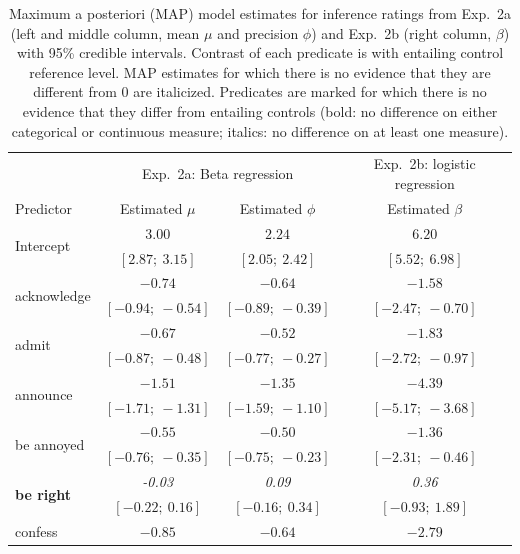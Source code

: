 \documentclass[11pt,fleqn]{article}
\newcommand{\6}{\mbox{$[\hspace*{-.6mm}[$}}
\newcommand{\9}{\mbox{$]\hspace*{-.6mm}]$}}
\begin{document}
\begin{table}
\caption{Maximum a posteriori (MAP) model estimates for inference ratings from Exp.~2a (left and middle column, mean $\mu$ and precision $\phi$) and Exp.~2b (right column, $\beta$)  with 95\% credible intervals. Contrast of each predicate is with entailing control reference level. MAP estimates for which there is no evidence that they are different from 0 are italicized. Predicates are marked for which there is no evidence that they differ from  entailing controls (bold: no difference on either categorical or continuous measure; italics: no difference on at least one measure).}
\small
\begin{center}
\begin{tabular}{l c c c}
\toprule
& \multicolumn{2}{c}{Exp.~2a: Beta regression} & Exp.~2b: logistic regression \\
Predictor & Estimated $\mu$ & Estimated $\phi$ & Estimated $\beta$\\
\midrule
\multirow{2}{*}{Intercept}            & $3.00$        & $2.24$        & $6.20$          \\
                        & $[2.87;\ 3.15]$   & $[2.05;\ 2.42]$   & $[5.52;\ 6.98]$     \\
\multirow{2}{*}{acknowledge}      & $-0.74$       & $-0.64$       & $-1.58$         \\
                        & $[-0.94;\ -0.54]$ & $[-0.89;\ -0.39]$ & $[-2.47;\ -0.70]$   \\
\multirow{2}{*}{admit}            & $-0.67$       & $-0.52$       & $-1.83$         \\
                        & $[-0.87;\ -0.48]$ & $[-0.77;\ -0.27]$ & $[-2.72;\ -0.97]$   \\
\multirow{2}{*}{announce}         & $-1.51$       & $-1.35$       & $-4.39$         \\
                        & $[-1.71;\ -1.31]$ & $[-1.59;\ -1.10]$ & $[-5.17;\ -3.68]$   \\
\multirow{2}{*}{be annoyed}      & $-0.55$       & $-0.50$       & $-1.36$         \\
                        & $[-0.76;\ -0.35]$ & $[-0.75;\ -0.23]$ & $[-2.31;\ -0.46]$   \\
\multirow{2}{*}{\textbf{be right}}        & \emph{-0.03}           & \emph{0.09}            & \emph{0.36}              \\
                        & $[-0.22;\ 0.16]$  & $[-0.16;\ 0.34]$  & $[-0.93;\ 1.89]$    \\
\multirow{2}{*}{confess}          & $-0.85$       & $-0.64$       & $-2.79$         \\

\end{tabular}
\end{center}
\end{table}
\end{document}
